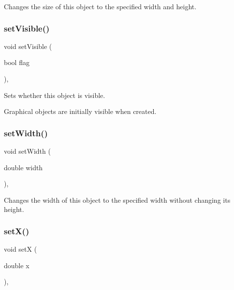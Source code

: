 Changes the size of this object to the specified width and height. 

\mbox{\label{classGObject_a88203f28224315d9f4471212f4af8ed3}} 
\subsubsection{\texorpdfstring{set\+Visible()}{setVisible()}}
{\footnotesize\ttfamily void set\+Visible (\begin{DoxyParamCaption}\item[{bool}]{flag }\end{DoxyParamCaption})\hspace{0.3cm}{\ttfamily [virtual]}, {\ttfamily [inherited]}}



Sets whether this object is visible. 

Graphical objects are initially visible when created. \mbox{\label{classGObject_aa3f3fba4cb131baa8696ba01e3bceca1}} 
\subsubsection{\texorpdfstring{set\+Width()}{setWidth()}}
{\footnotesize\ttfamily void set\+Width (\begin{DoxyParamCaption}\item[{double}]{width }\end{DoxyParamCaption})\hspace{0.3cm}{\ttfamily [virtual]}, {\ttfamily [inherited]}}



Changes the width of this object to the specified width without changing its height. 

\mbox{\label{classGObject_a9c18fcc579333bf9653d13ad2b372e39}} 
\subsubsection{\texorpdfstring{set\+X()}{setX()}}
{\footnotesize\ttfamily void setX (\begin{DoxyParamCaption}\item[{double}]{x }\end{DoxyParamCaption})\hspace{0.3cm}{\ttfamily [virtual]}, {\ttfamily [inherited]}}



